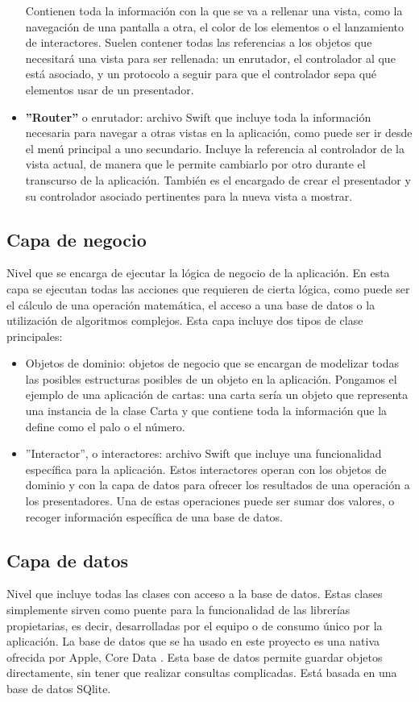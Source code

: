 \begin{itemize}
	Contienen toda la información con la que se va a rellenar una vista, como la navegación de una pantalla a otra, el color de los elementos o el lanzamiento de interactores. Suelen contener todas las referencias a los objetos que necesitará una vista para ser rellenada: un enrutador, el controlador al que está asociado, y un protocolo a seguir para que el controlador sepa qué elementos usar de un presentador.
	\item \textbf{''Router''} o enrutador: archivo Swift que incluye toda la información necesaria para navegar a otras vistas en la aplicación, como puede ser ir desde el menú principal a uno secundario. Incluye la referencia al controlador de la vista actual, de manera que le permite cambiarlo por otro durante el transcurso de la aplicación. También es el encargado de crear el presentador y su controlador asociado pertinentes para la nueva vista a mostrar.
\end{itemize}

\subsection{Capa de negocio}
Nivel que se encarga de ejecutar la lógica de negocio de la aplicación. En esta capa se ejecutan todas las acciones que requieren de cierta lógica, como puede ser el cálculo de una operación matemática, el acceso a una base de datos o la utilización de algoritmos complejos.
Esta capa incluye dos tipos de clase principales:
\begin{itemize}
	\item Objetos de dominio: objetos de negocio que se encargan de modelizar todas las posibles estructuras posibles de un objeto en la aplicación. Pongamos el ejemplo de una aplicación de cartas: una carta sería un objeto que representa una instancia de la clase Carta y que contiene toda la información que la define como el palo o el número.
	\item ''Interactor'', o interactores: archivo Swift que incluye una funcionalidad específica para la aplicación. Estos interactores operan con los objetos de dominio y con la capa de datos para ofrecer los resultados de una operación a los presentadores. Una de estas operaciones puede ser sumar dos valores, o recoger información específica de una base de datos.
\end{itemize}

\subsection{Capa de datos}
Nivel que incluye todas las clases con acceso a la base de datos. Estas clases simplemente sirven como puente para la funcionalidad de las librerías propietarias, es decir, desarrolladas por el equipo o de consumo único por la aplicación.
La base de datos que se ha usado en este proyecto es una nativa ofrecida por Apple, Core Data \cite{coreDataDocumentation}.
Esta base de datos permite guardar objetos directamente, sin tener que realizar consultas complicadas. Está basada en una base de datos SQlite.